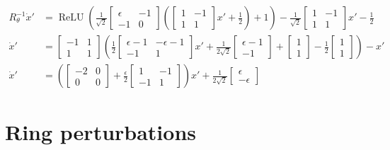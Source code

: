 \documentclass{article} %
\newcounter{ct}
\theoremstyle{definition}
\theoremstyle{remark}
\begin{document}
\begin{align}
R_{\theta}^{-1}\dot x' &= \operatorname{ReLU}\left(\frac{1}{\sqrt{2}}\begin{bmatrix}\epsilon &-1\\-1&0\end{bmatrix}\left(\begin{bmatrix}1 &-1\\1&1\end{bmatrix} x'+\frac{1}{2}\right)+1\right)-\frac{1}{\sqrt{2}}\begin{bmatrix}1 &-1\\1&1\end{bmatrix} x'-\frac{1}{2}\\
\dot x' &=\begin{bmatrix}-1 &1\\1&1\end{bmatrix}\left(\frac{1}{2}\begin{bmatrix}\epsilon-1 &-\epsilon-1\\-1&1\end{bmatrix}x' + \frac{1}{2\sqrt{2}}\begin{bmatrix}\epsilon-1 \\-1\end{bmatrix}+\begin{bmatrix}1 \\1\end{bmatrix}-\frac{1}{2}\begin{bmatrix}1 \\1\end{bmatrix}\right)-x'\\
\dot x' &=\left(\begin{bmatrix}-2 &0\\0&0\end{bmatrix}+\frac{\epsilon}{2}\begin{bmatrix}1 &-1\\-1&1\end{bmatrix}\right)x' + \frac{1}{2\sqrt{2}}\begin{bmatrix}\epsilon \\-\epsilon\end{bmatrix}
\end{align}






\section{Ring perturbations}
\end{document}
